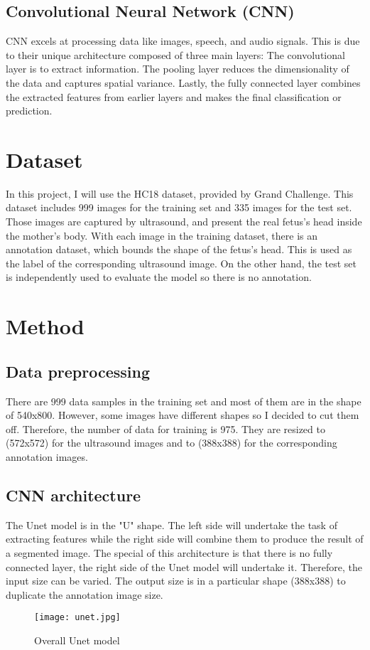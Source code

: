 \documentclass[conference]{IEEEtran}
\begin{document}
\subsection{Convolutional Neural Network (CNN)} CNN excels at processing data like images, speech, and audio signals. This is due to their unique architecture composed of three main layers: The convolutional layer is to extract information. The pooling layer reduces the dimensionality of the data and captures spatial variance. Lastly, the fully connected layer combines the extracted features from earlier layers and makes the final classification or prediction.

\section{Dataset}
In this project, I will use the HC18 dataset, provided by Grand Challenge. This dataset includes 999 images for the training set and 335 images for the test set. Those images are captured by ultrasound, and present the real fetus's head inside the mother's body. With each image in the training dataset, there is an annotation dataset, which bounds the shape of the fetus's head. This is used as the label of the corresponding ultrasound image. On the other hand, the test set is independently used to evaluate the model so there is no annotation.\\

\section{Method}
\subsection{Data preprocessing} There are 999 data samples in the training set and most of them are in the shape of 540x800. However, some images have different shapes so I decided to cut them off. Therefore, the number of data for training is 975. They are resized to (572x572) for the ultrasound images and to (388x388) for the corresponding annotation images.
\subsection{CNN architecture} The Unet model is in the "U" shape. The left side will undertake the task of extracting features while the right side will combine them to produce the result of a segmented image. The special of this architecture is that there is no fully connected layer, the right side of the Unet model will undertake it. Therefore, the input size can be varied. The output size is in a particular shape (388x388) to duplicate the annotation image size.
\begin{figure}[hbt!]
    \centering
    \texttt{[image: unet.jpg]}
    \caption{Overall Unet model}
    \label{fig:Loss}
\end{figure}
\mbox{}\\\\
\end{document}
